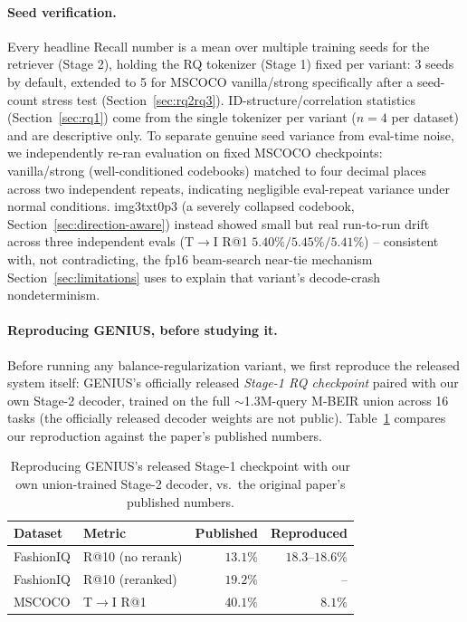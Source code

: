 \paragraph{Seed verification.} Every headline Recall number is a mean over multiple training seeds for the retriever (Stage 2), holding the RQ tokenizer (Stage 1) fixed per variant: 3 seeds by default, extended to 5 for MSCOCO vanilla/strong specifically after a seed-count stress test (Section~\ref{sec:rq2rq3}). ID-structure/correlation statistics (Section~\ref{sec:rq1}) come from the single tokenizer per variant ($n=4$ per dataset) and are descriptive only. To separate genuine seed variance from eval-time noise, we independently re-ran evaluation on fixed MSCOCO checkpoints: vanilla/strong (well-conditioned codebooks) matched to four decimal places across two independent repeats, indicating negligible eval-repeat variance under normal conditions. img3txt0p3 (a severely collapsed codebook, Section~\ref{sec:direction-aware}) instead showed small but real run-to-run drift across three independent evals (T$\to$I R@1 $5.40\%/5.45\%/5.41\%$) -- consistent with, not contradicting, the fp16 beam-search near-tie mechanism Section~\ref{sec:limitations} uses to explain that variant's decode-crash nondeterminism.

\paragraph{Reproducing GENIUS, before studying it.} Before running any balance-regularization variant, we first reproduce the released system itself: GENIUS's officially released \emph{Stage-1 RQ checkpoint} paired with our own Stage-2 decoder, trained on the full $\sim$1.3M-query M-BEIR union across 16 tasks (the officially released decoder weights are not public). Table~\ref{tab:reproduction} compares our reproduction against the paper's published numbers.

\begin{table}[t]
\centering
\caption{Reproducing GENIUS's released Stage-1 checkpoint with our own union-trained Stage-2 decoder, vs.\ the original paper's published numbers.}
\label{tab:reproduction}
\footnotesize
\begin{tabular}{@{}llrr@{}}
\toprule
Dataset & Metric & Published & Reproduced \\
\midrule
FashionIQ & R@10 (no rerank) & $13.1\%$ & $18.3$--$18.6\%$ \\
FashionIQ & R@10 (reranked)  & $19.2\%$ & -- \\
MSCOCO    & T$\to$I R@1      & $40.1\%$ & $8.1\%$ \\
\bottomrule
\end{tabular}
\end{table}

